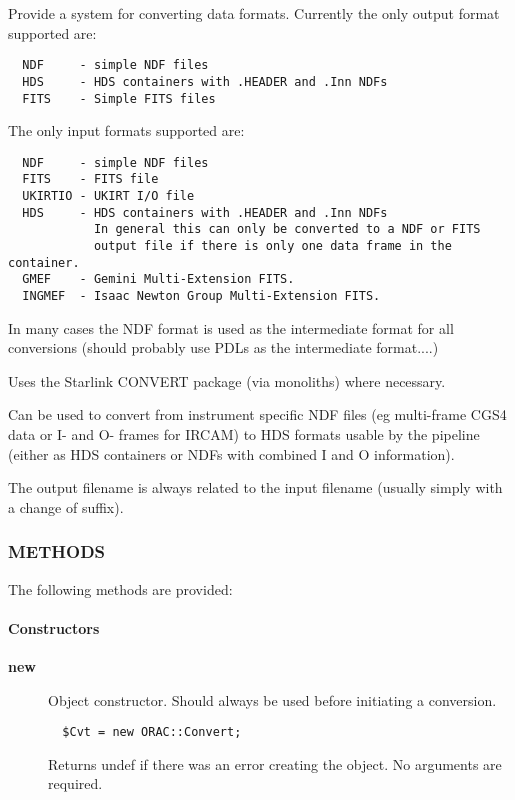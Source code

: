 Provide a system for converting data formats. Currently the
only output format supported are:

\begin{verbatim}
  NDF     - simple NDF files
  HDS     - HDS containers with .HEADER and .Inn NDFs
  FITS    - Simple FITS files
\end{verbatim}


The only input formats supported are:

\begin{verbatim}
  NDF     - simple NDF files
  FITS    - FITS file
  UKIRTIO - UKIRT I/O file
  HDS     - HDS containers with .HEADER and .Inn NDFs
            In general this can only be converted to a NDF or FITS
            output file if there is only one data frame in the container.
  GMEF    - Gemini Multi-Extension FITS.
  INGMEF  - Isaac Newton Group Multi-Extension FITS.
\end{verbatim}


In many cases the NDF format is used as the intermediate format for
all conversions (should probably use PDLs as the intermediate
format....)



Uses the Starlink CONVERT package (via monoliths) where necessary.



Can be used to convert from instrument specific NDF files (eg
multi-frame CGS4 data or I- and O- frames for IRCAM) to HDS formats
usable by the pipeline (either as HDS containers or NDFs with combined
I and O information).



The output filename is always related to the input filename
(usually simply with a change of suffix).

\subsubsection*{METHODS\label{ORAC::Convert_METHODS}}


The following methods are provided:

\paragraph*{Constructors\label{ORAC::Convert_Constructors}}
\begin{description}

\item[{\textbf{new}}] \mbox{}

Object constructor. Should always be used before initiating a conversion.

\begin{verbatim}
  $Cvt = new ORAC::Convert;
\end{verbatim}


Returns undef if there was an error creating the object. No arguments
are required.

\end{description}
